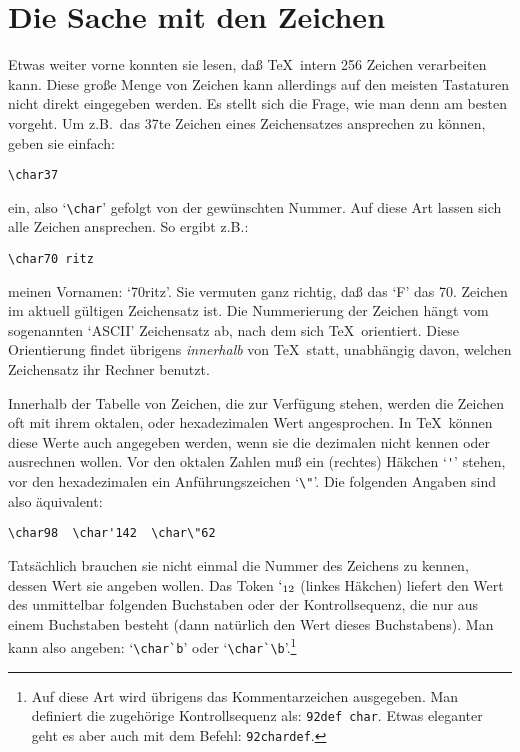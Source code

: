 \section{Die Sache mit den Zeichen}
Etwas weiter vorne konnten sie lesen, da\ss{} \TeX\ intern 256 Zeichen
verarbeiten kann. Diese gro\ss{}e Menge von Zeichen kann allerdings auf
den meisten Tastaturen nicht direkt eingegeben werden. Es stellt sich
die Frage, wie man denn am besten vorgeht.
Um z.B.\ das 37te Zeichen eines Zeichensatzes ansprechen zu k\"onnen,
geben sie einfach:
\begin{verbatim}
\char37
\end{verbatim}
ein, also `\verb|\char|' gefolgt von der gew\"unschten Nummer. Auf diese
Art lassen sich alle Zeichen ansprechen. So ergibt z.B.:
\begin{verbatim}
\char70 ritz
\end{verbatim}
meinen Vornamen: `\char70ritz'. Sie vermuten ganz richtig, da\ss{} das `F' das
70. Zeichen im aktuell g\"ultigen Zeichensatz ist. Die Nummerierung der
Zeichen h\"angt vom sogenannten 
`ASCII' Zeichensatz ab, nach dem sich
\TeX\ orientiert. Diese Orientierung findet \"ubrigens {\em innerhalb}
von \TeX\ statt, unabh\"angig davon, welchen Zeichensatz ihr Rechner
benutzt.

Innerhalb der Tabelle von Zeichen, die zur Verf\"ugung stehen, werden
die Zeichen oft mit ihrem 
oktalen, oder hexadezimalen Wert
angesprochen. In \TeX\ k\"onnen diese Werte auch angegeben werden, wenn
sie die 
dezimalen nicht kennen oder ausrechnen wollen. Vor den 
oktalen
Zahlen mu\ss{} ein (rechtes) H\"akchen `\verb|'|' stehen, vor den
hexadezimalen ein 
Anf\"uhrungszeichen `\verb|\"|'. Die folgenden Angaben
sind also \"aquivalent:
\begin{verbatim}
\char98  \char'142  \char\"62
\end{verbatim}
Tats\"achlich brauchen sie nicht einmal die Nummer des Zeichens zu
kennen, dessen Wert sie angeben wollen. Das Token $`_{12}$ (linkes
H\"akchen) liefert den Wert des unmittelbar folgenden Buchstaben oder
der 
Kontrollsequenz, die nur aus einem Buchstaben besteht (dann
nat\"urlich den Wert dieses Buchstabens). Man kann also angeben:
`\verb|\char`b|' oder `\verb|\char`\b|'.\footnote{Auf diese Art wird
\"ubrigens das 
Kommentarzeichen ausgegeben. Man definiert die zugeh\"orige
Kontrollsequenz als: {\tt\char92def
char}. Etwas eleganter geht es aber auch
mit dem Befehl: {\tt\char92chardef}.}

